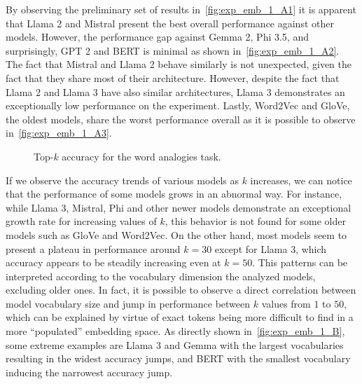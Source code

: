 By observing the preliminary set of results in~\cref{fig:exp_emb_1_A1} it is apparent that Llama 2 and Mistral present the best overall performance against other models.
However, the performance gap against Gemma 2, Phi 3.5, and surprisingly, GPT 2 and BERT is minimal as shown in~\cref{fig:exp_emb_1_A2}.
The fact that Mistral and Llama 2 behave similarly is not unexpected, given the fact that they share most of their architecture.
However, despite the fact that Llama 2 and Llama 3 have also similar architectures, Llama 3 demonstrates an exceptionally low performance on the experiment.
Lastly, Word2Vec and GloVe, the oldest models, share the worst performance overall as it is possible to observe in~\cref{fig:exp_emb_1_A3}.

\begin{figure}[t!]
    \centering
    \quad
    \caption{Top-$k$ accuracy for the word analogies task.}
    \label{fig:exp_emb_1_A}
\end{figure}

If we observe the accuracy trends of various models as $k$ increases, we can notice that the performance of some models grows in an abnormal way.
For instance, while Llama 3, Mistral, Phi and other newer models demonstrate an exceptional growth rate for increasing values of $k$, this behavior is not found for some older models such as GloVe and Word2Vec.
On the other hand, most models seem to present a plateau in performance around $k = 30$ except for Llama 3, which accuracy appears to be steadily increasing even at $k = 50$.
This patterns can be interpreted according to the vocabulary dimension the analyzed models, excluding older ones.
In fact, it is possible to observe a direct correlation between model vocabulary size and jump in performance between $k$ values from $1$ to $50$, which can be explained by virtue of exact tokens being more difficult to find in a more ``populated'' embedding space.
As directly shown in~\cref{fig:exp_emb_1_B}, some extreme examples are Llama 3 and Gemma with the largest vocabularies resulting in the widest accuracy jumps, and BERT with the smallest vocabulary inducing the narrowest accuracy jump.

